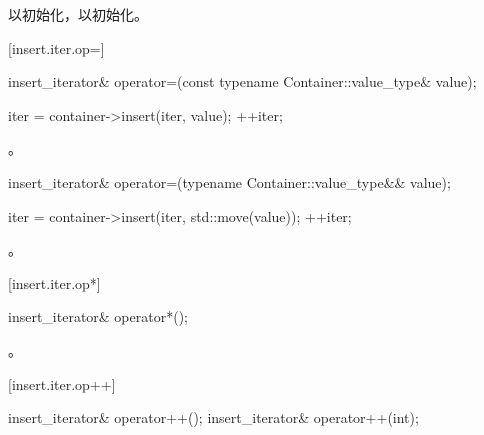 \begin{itemdescr}
\pnum
\effects
以初始化，以初始化。
\end{itemdescr}

[insert.iter.op=]{}

%
\begin{itemdecl}
insert_iterator& operator=(const typename Container::value_type& value);
\end{itemdecl}

\begin{itemdescr}
\pnum
\effects
\begin{codeblock}
iter = container->insert(iter, value);
++iter;
\end{codeblock}

\pnum
\returns
{}。
\end{itemdescr}

%
\begin{itemdecl}
insert_iterator& operator=(typename Container::value_type&& value);
\end{itemdecl}

\begin{itemdescr}
\pnum
\effects
\begin{codeblock}
iter = container->insert(iter, std::move(value));
++iter;
\end{codeblock}

\pnum
\returns
{}。
\end{itemdescr}

[insert.iter.op*]{}

%
\begin{itemdecl}
insert_iterator& operator*();
\end{itemdecl}

\begin{itemdescr}
\pnum
\returns
{}。
\end{itemdescr}

[insert.iter.op++]{}

%
\begin{itemdecl}
insert_iterator& operator++();
insert_iterator& operator++(int);
\end{itemdecl}

